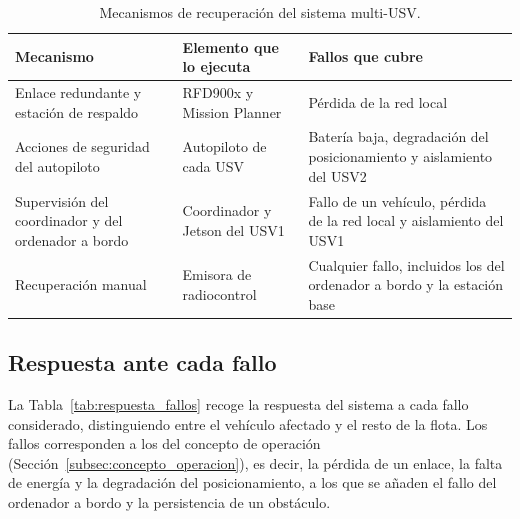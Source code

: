 \begin{table}[!htb]
\centering
\caption{Mecanismos de recuperación del sistema multi-USV.}
\label{tab:mecanismos_recuperacion}
\small
\begin{tabularx}{\textwidth}{|>{\raggedright\arraybackslash}p{4.2cm}|>{\raggedright\arraybackslash}p{3.8cm}|>{\raggedright\arraybackslash}X|}
\hline
\textbf{Mecanismo} & \textbf{Elemento que lo ejecuta} & \textbf{Fallos que cubre} \\ \hline
Enlace redundante y estación de respaldo & RFD900x y Mission Planner & Pérdida de la red local \\ \hline
Acciones de seguridad del autopiloto & Autopiloto de cada USV & Batería baja, degradación del posicionamiento y aislamiento del USV2 \\ \hline
Supervisión del coordinador y del ordenador a bordo & Coordinador y Jetson del USV1 & Fallo de un vehículo, pérdida de la red local y aislamiento del USV1 \\ \hline
Recuperación manual & Emisora de radiocontrol & Cualquier fallo, incluidos los del ordenador a bordo y la estación base \\ \hline
\end{tabularx}
\end{table}

\subsection{Respuesta ante cada fallo}
\label{subsec:respuesta_fallos}

La Tabla~\ref{tab:respuesta_fallos} recoge la respuesta del sistema a cada fallo considerado, distinguiendo entre el vehículo afectado y el resto de la flota. Los fallos corresponden a los del concepto de operación (Sección~\ref{subsec:concepto_operacion}), es decir, la pérdida de un enlace, la falta de energía y la degradación del posicionamiento, a los que se añaden el fallo del ordenador a bordo y la persistencia de un obstáculo. %

